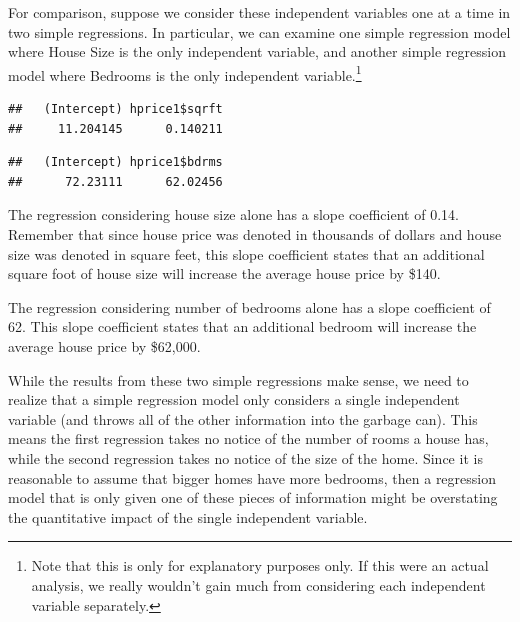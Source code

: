 \documentclass[
]{book}
\newenvironment{Shaded}{\begin{snugshade}}{\end{snugshade}}
\newcommand{\FunctionTok}[1]{\textcolor[rgb]{0.13,0.29,0.53}{\textbf{#1}}}
\newcommand{\NormalTok}[1]{#1}
\newcommand{\OtherTok}[1]{\textcolor[rgb]{0.56,0.35,0.01}{#1}}
\newcommand{\SpecialCharTok}[1]{\textcolor[rgb]{0.81,0.36,0.00}{\textbf{#1}}}
\begin{document}
For comparison, suppose we consider these independent variables one at a time in two simple regressions. In particular, we can examine one simple regression model where House Size is the only independent variable, and another simple regression model where Bedrooms is the only independent variable.\footnote{Note that this is only for explanatory purposes only. If this were an actual analysis, we really wouldn't gain much from considering each independent variable separately.}

\begin{Shaded}
\end{Shaded}

\begin{verbatim}
##   (Intercept) hprice1$sqrft 
##     11.204145      0.140211
\end{verbatim}

\begin{Shaded}
\end{Shaded}

\begin{verbatim}
##   (Intercept) hprice1$bdrms 
##      72.23111      62.02456
\end{verbatim}

The regression considering house size alone has a slope coefficient of 0.14. Remember that since house price was denoted in thousands of dollars and house size was denoted in square feet, this slope coefficient states that an additional square foot of house size will increase the average house price by \$140.

The regression considering number of bedrooms alone has a slope coefficient of 62. This slope coefficient states that an additional bedroom will increase the average house price by \$62,000.

While the results from these two simple regressions make sense, we need to realize that a simple regression model only considers a single independent variable (and throws all of the other information into the garbage can). This means the first regression takes no notice of the number of rooms a house has, while the second regression takes no notice of the size of the home. Since it is reasonable to assume that bigger homes have more bedrooms, then a regression model that is only given one of these pieces of information might be overstating the quantitative impact of the single independent variable.
\end{document}
